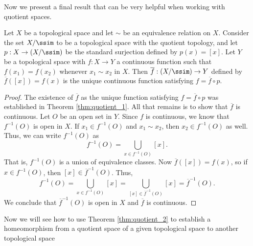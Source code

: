 
Now we present a final result that can be very helpful when working with quotient spaces.

\begin{theorem} \label{thm:quotient_2} Let $X$ be a topological space and let $\sim$ be an equivalence relation on $X$. Consider the set $X/\ssim$ to be a topological space with the quotient topology, and let $p: X \to (X/\ssim)$ be the standard surjection defined by $p(x) = [x]$. Let $Y$ be a topological space with $f: X \to Y$ a continuous function such that $f(x_1) = f(x_2)$ whenever $x_1 \sim x_2$ in $X$. Then $\overline{f} : (X/\ssim) \to Y$ defined by $\overline{f}([x]) = f(x)$ is the unique continuous function satisfying $f = \overline{f} \circ p$.
\end{theorem}

\begin{proof} The existence of $\overline{f}$ as the unique function satisfying $f = \overline{f} \circ p$ was established in Theorem \ref{thm:quotient_1}. All that remains is to show that $\overline{f}$ is continuous. Let $O$ be an open set in $Y$. Since $f$ is continuous, we know that $f^{-1}(O)$ is open in $X$. If $x_1 \in f^{-1}(O)$ and $x_1 \sim x_2$, then $x_2 \in f^{-1}(O)$ as well. Thus, we can write $f^{-1}(O)$ as
\[f^{-1}(O) = \bigcup_{x \in f^{-1}(O)} [x].\]
That is, $f^{-1}(O)$ is a union of equivalence classes. Now $\overline{f}([x]) = f(x)$, so if $x \in f^{-1}(O)$, then $[x] \in \overline{f}^{-1}(O)$. Thus,
\[f^{-1}(O) = \bigcup_{x \in f^{-1}(O)} [x] = \bigcup_{[x] \in \overline{f}^{-1}(O)} [x] = \overline{f}^{-1}(O).\]
We conclude that $\overline{f}^{-1}(O)$ is open in $X$ and $\overline{f}$ is continuous. 
\end{proof}

Now we will see how to use Theorem \ref{thm:quotient_2} to establish a homeomorphism from a quotient space of a given topological space to another topological space

